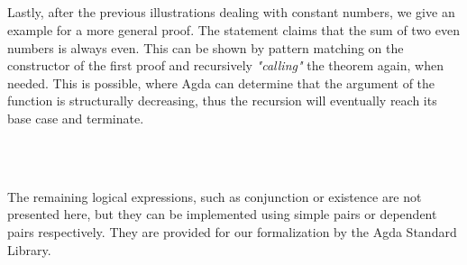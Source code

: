 \begin{code}
    \>[0]\AgdaSpace{}%
    \AgdaSymbol{:}\AgdaSpace{}%
    \AgdaSpace{}%
    \AgdaSpace{}%
    \<%
    \\
    \>[0]\<%
    \\
    \>[0]\<%
    \\
    \>[0]\<%
    \\
    \>[0]\AgdaSpace{}%
    \AgdaSymbol{(}\AgdaSpace{}%
    \AgdaSymbol{(}\AgdaSpace{}%
    \AgdaSymbol{()))}\<%
\end{code}

Lastly, after the previous illustrations dealing with constant numbers, we give an example for a more general proof. The statement claims that the sum of two even numbers is always even. This can be shown by pattern matching on the constructor of the first proof and recursively \textit{"calling"} the theorem again, when needed. This is possible, where Agda can determine that the argument of the function is structurally decreasing, thus the recursion will eventually reach its base case and terminate.

\begin{code}
    \>[0]\AgdaSpace{}%
    \AgdaSymbol{:}\AgdaSpace{}%
    \AgdaSymbol{\{}\AgdaSpace{}%
    \AgdaSpace{}%
    \AgdaSymbol{:}\AgdaSpace{}%
    \AgdaSymbol{\}}\AgdaSpace{}%
    \AgdaSpace{}%
    \AgdaSpace{}%
    \AgdaSpace{}%
    \AgdaSpace{}%
    \AgdaSpace{}%
    \AgdaSpace{}%
    \AgdaSpace{}%
    \AgdaSpace{}%
    \AgdaSymbol{(}\AgdaSpace{}%
    \AgdaOperator{\AgdaFunction{+}}\AgdaSpace{}%
    \AgdaSymbol{)}\<%
    \\
    \>[0]\AgdaSpace{}%
    \AgdaSpace{}%
    \AgdaSpace{}%
    \AgdaSymbol{=}\AgdaSpace{}%
    \<%
    \\
    \>[0]\AgdaSpace{}%
    \AgdaSymbol{(}\AgdaSpace{}%
    \AgdaSymbol{)}\AgdaSpace{}%
    \AgdaSpace{}%
    \AgdaSymbol{=}\AgdaSpace{}%
    \AgdaSpace{}%
    \AgdaSymbol{(}\AgdaSpace{}%
    \AgdaSpace{}%
    \AgdaSymbol{)}\<%
\end{code}

The remaining logical expressions, such as conjunction or existence are not presented here, but they can be implemented using simple pairs or dependent pairs respectively. They are provided for our formalization by the Agda Standard Library\cite{agda-stdlib}.
